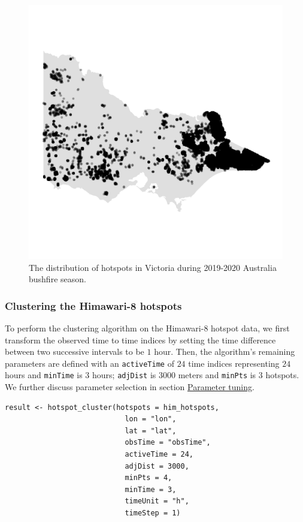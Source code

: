 \begin{Schunk}
\begin{figure}

{\centering \includegraphics[width=0.8\linewidth]{figures/before_clustering} 

}

\caption[The distribution of hotspots in Victoria during 2019-2020 Australia bushfire season]{The distribution of hotspots in Victoria during 2019-2020 Australia bushfire season.}\label{fig:hotspots}
\end{figure}
\end{Schunk}

\hypertarget{clustering-the-himawari-8-hotspots}{%
\subsubsection{Clustering the Himawari-8
hotspots}\label{clustering-the-himawari-8-hotspots}}

To perform the clustering algorithm on the Himawari-8 hotspot data, we
first transform the observed time to time indices by setting the time
difference between two successive intervals to be \(1\) hour. Then, the
algorithm's remaining parameters are defined with an \texttt{activeTime}
of \(24\) time indices representing \(24\) hours and \texttt{minTime} is
\(3\) hours; \texttt{adjDist} is \(3000\) meters and \texttt{minPts} is
\(3\) hotspots. We further discuss parameter selection in section
\protect\hyperlink{parameter-tuning}{Parameter tuning}.

\begin{verbatim}
result <- hotspot_cluster(hotspots = him_hotspots,
                            lon = "lon",
                            lat = "lat",
                            obsTime = "obsTime",
                            activeTime = 24,
                            adjDist = 3000,
                            minPts = 4,
                            minTime = 3,
                            timeUnit = "h",
                            timeStep = 1)
\end{verbatim}


